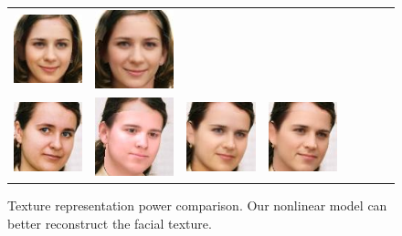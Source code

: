 \begin{figure}[t!]
\begin{center}
\begin{tabular}{ @{}c@{}c@{}c@{}c@{}c@{}c@{}c@{\hskip 1.5mm}c@{}}
\includegraphics[width=\afifthcolumn]{img/tex_grad_descent/pred_img_30.jpg} &
\includegraphics[width=\afifthcolumn]{img/tex_grad_descent/pred_img_30_enc.jpg} &
\\
\includegraphics[width=\afifthcolumn]{img/tex_grad_descent/pred_img_45_gt.jpg} &
\includegraphics[trim=7 7 7 7,clip,width=\afifthcolumn]{img/tex_grad_descent/pred_img_45_linear.jpg} &
\includegraphics[width=\afifthcolumn]{img/tex_grad_descent/pred_img_45.jpg} &
\includegraphics[width=\afifthcolumn]{img/tex_grad_descent/pred_img_45_enc.jpg} &
\\
\end{tabular}
\vspace{-2mm}
\caption{\small Texture representation power comparison. Our nonlinear model can better reconstruct the facial texture.}
\label{fig:tex_representationpower}\figvspace
\end{center}
\end{figure}

